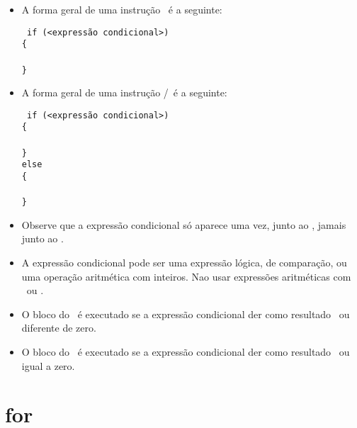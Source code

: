 \begin{itemize}

\item A forma geral de uma instrução \IF\ é a seguinte:

{\tt 
if (<expressão condicional>)                     \\
\{                                               \\
  \\
\}                                               \\
}

\item A forma geral de uma instrução \IF/\ELSE\ é a seguinte:

{\tt 
if (<expressão condicional>)                     \\
\{                                               \\
  \\
\}                                               \\
else                                             \\
\{                                               \\
   \\
\}                                               \\
}

\item Observe que a expressão condicional só aparece uma vez, junto ao \IF, jamais junto ao \ELSE.

\item A expressão condicional pode ser uma expressão lógica, de comparação, ou uma operação aritmética com inteiros. Nao usar expressões aritméticas com \FLOAT\ ou \DOUBLE.
\item O bloco do \IF\ é executado se a expressão condicional der como resultado \TRUE\ ou diferente de zero.
\item O bloco do \ELSE\ é executado se a expressão condicional der como resultado \FALSE\ ou igual a zero.

\end{itemize}


\section{for}
\label{sec:for}

